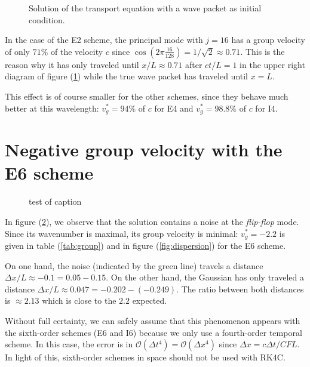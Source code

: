 \documentclass[11 pt]{article}
\begin{document}
\begin{figure}[H]
    \centering
    
    \caption{Solution of the transport equation with a wave packet as initial condition.}
    \label{fig:wave_packet}
\end{figure}

In the case of the E2 scheme, the principal mode with $j=16$ has a group velocity of only $71\%$ of the velocity $c$ since $\cos{(2 \pi \frac{16}{128})} = 1/\sqrt{2} \approx 0.71$. This is the reason why it has only traveled until $x/L \approx 0.71$ after $ct/L=1$ in the upper right diagram of figure (\ref{fig:wave_packet}) while the true wave packet has traveled until $x=L$.

This effect is of course smaller for the other schemes, since they behave much better at this wavelength: $v_g^* = 94 \%$ of $c$ for E4 and $v_g^* = 98.8 \% $ of $c$ for I4.


\section{Negative group velocity with the E6 scheme}
\begin{figure}[H]
    \centering
    
    \caption{test of caption}
    \label{fig:problem}
\end{figure}

\vspace{-3mm}
In figure (\ref{fig:problem}), we observe that the solution contains a noise at the \textit{flip-flop} mode. Since its wavenumber is maximal, its group velocity is minimal: $v_g^* = -2.2$ is given in table (\ref{tab:group}) and in figure (\ref{fig:dispersion}) for the E6 scheme.

On one hand, the noise (indicated by the green line) travels a distance $\Delta x / L \approx -0.1 = 0.05 - 0.15$. On the other hand, the Gaussian has only traveled a distance $\Delta x / L \approx 0.047 = -0.202 - (-0.249)$. The ratio between both distances is $\approx 2.13$ which is close to the $2.2$ expected.

Without full certainty, we can safely assume that this phenomenon appears with the sixth-order schemes (E6 and I6) because we only use a fourth-order temporal scheme. In this case, the error is in $\mathcal{O}(\Delta t^4) = \mathcal{O}(\Delta x^4)$ since $\Delta x = c \Delta t / CFL$. In light of this, sixth-order schemes in space should not be used with RK4C.

\vspace{-3mm}

\nocite{*}

\end{document}
